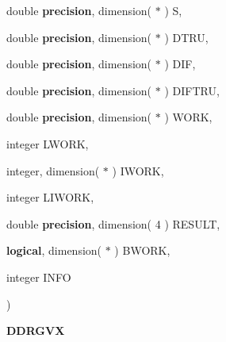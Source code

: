{\begin{DoxyParamCaption}
\item[{double {\bf precision}, dimension( $\ast$ )}]{S, }
\item[{double {\bf precision}, dimension( $\ast$ )}]{D\+T\+R\+U, }
\item[{double {\bf precision}, dimension( $\ast$ )}]{D\+I\+F, }
\item[{double {\bf precision}, dimension( $\ast$ )}]{D\+I\+F\+T\+R\+U, }
\item[{double {\bf precision}, dimension( $\ast$ )}]{W\+O\+R\+K, }
\item[{integer}]{L\+W\+O\+R\+K, }
\item[{integer, dimension( $\ast$ )}]{I\+W\+O\+R\+K, }
\item[{integer}]{L\+I\+W\+O\+R\+K, }
\item[{double {\bf precision}, dimension( 4 )}]{R\+E\+S\+U\+L\+T, }
\item[{{\bf logical}, dimension( $\ast$ )}]{B\+W\+O\+R\+K, }
\item[{integer}]{I\+N\+F\+O}
\end{DoxyParamCaption}
)}\label{group__double__eig_ga12fe443f6eebc293d99eae77fa84d9c5}


{\bfseries D\+D\+R\+G\+V\+X} 

